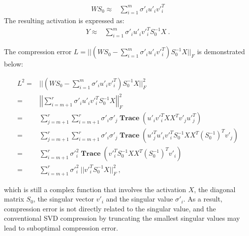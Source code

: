 \begin{align*}
WS_0 \approx & \sum_{i=1}^m \sigma'_i u'_i {v'}_i^T
\end{align*}
The resulting activation is expressed as:
\begin{align*}
    Y \approx & \sum_{i=1}^m \sigma'_i u'_i {v'}_i^T S_0^{-1}X ~.
\end{align*} 

The compression error $L=||(WS_0-\sum_{i=1}^{m}\sigma'_i u'_i {v'}_i^T)S_0^{-1}X||_F$ is demonstrated below:

\begin{align*}
L^2 =& ||(WS_0-\sum_{i=1}^{m}\sigma'_i u'_i {v'}_i^T)S_0^{-1}X||_F^2 \\
=& \left|\left|\sum_{i=m+1}^r \sigma'_iu'_i{v'}_i^{T}S_0^{-1}X\right|\right|_F^2 \\
=& \sum_{j=m+1}^r\sum_{i=m+1}^r \sigma'_i\sigma'_j\boldsymbol{\operatorname{Trace}}(u'_i {v'}_i^T X X^T v'_j {u'}_j^T) \\
=& \sum_{j=m+1}^r\sum_{i=m+1}^r \sigma'_i\sigma'_j\boldsymbol{\operatorname{Trace}}({u'}_j^T u'_i {v'}_i^T S_0^{-1}X X^T (S_0^{-1})^Tv'_j) \\
=& \sum_{i=m+1}^r{\sigma'}_i^2\boldsymbol{\operatorname{Trace}}({v'}_i^T S_0^{-1}X X^T (S_0^{-1})^T v'_i) \\
=& \sum_{i=m+1}^r{\sigma'}_i^2~||{v'}_i^T S_0^{-1} X||_F^2 ~,
\end{align*}

which is still a complex function that involves the activation $X$, the diagonal matrix $S_0$, the singular vector $v'_i$ and the singular value $\sigma'_i$. As a result, compression error is not directly related to the singular value, and the conventional SVD compression by truncating the smallest singular values may lead to suboptimal compression error.



